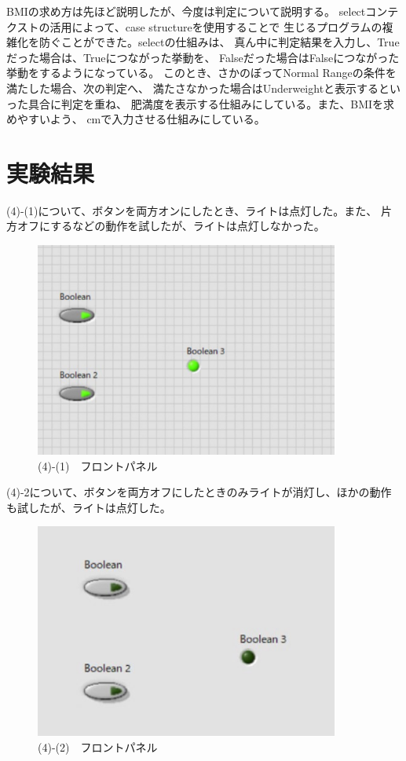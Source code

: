 \documentclass[a4paper,titlepage,11pt]{ltjsarticle}
\begin{document}
BMIの求め方は先ほど説明したが、今度は判定について説明する。
selectコンテクストの活用によって、case structureを使用することで
生じるプログラムの複雑化を防ぐことができた。selectの仕組みは、
真ん中に判定結果を入力し、Trueだった場合は、Trueにつながった挙動を、
Falseだった場合はFalseにつながった挙動をするようになっている。
このとき、さかのぼってNormal Rangeの条件を満たした場合、次の判定へ、
満たさなかった場合はUnderweightと表示するといった具合に判定を重ね、
肥満度を表示する仕組みにしている。また、BMIを求めやすいよう、
cmで入力させる仕組みにしている。

  \section{実験結果}
  (4)-(1)について、ボタンを両方オンにしたとき、ライトは点灯した。また、
  片方オフにするなどの動作を試したが、ライトは点灯しなかった。

  \begin{figure}[H]
    \begin{center}
      \includegraphics[width=100mm]{4-1f.pdf}
      \caption{(4)-(1)　フロントパネル}
    \end{center}
  \end{figure}

  (4)-2について、ボタンを両方オフにしたときのみライトが消灯し、ほかの動作
  も試したが、ライトは点灯した。

  \begin{figure}[H]
    \begin{center}
      \includegraphics[width=100mm]{4-2f.pdf}
      \caption{(4)-(2)　フロントパネル}
    \end{center}
  \end{figure}
\end{document}
